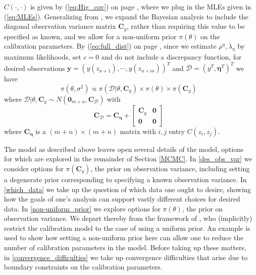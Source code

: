 \documentclass{article}
\begin{document}
$C(\cdot,\cdot)$ is given by (\ref{eq:Hig_cov}) on page \pageref{eq:Hig_cov}, where we plug in the MLEs given in (\ref{eq:MLEs}). Generalizing from \cite{Kennedy2006}, we expand the Bayesian analysis to include the diagonal observation variance matrix $\mathbf C_y$, rather than requiring this value to be specified as known, and we allow for a non-uniform prior $\pi(\theta)$ on the calibration parameters. By (\ref{eq:full_dist}) on page \pageref{eq:full_dist}, 
since we estimate $\rho^\eta,\lambda_\eta$ by maximum likelihoods, set $c=0$ and do not include a discrepancy function, for desired observations $\mathbf y=(y (z_{n+1}),\cdots,y(z_{n+m}))^T$ and $\mathcal D=(y^T, \boldsymbol\eta^T)^T$ we have
\begin{equation}\label{eq:the_model}
\pi(\theta,\sigma^2) \propto \pi (\mathcal D|\theta,\mathbf C_y)\times \pi(\theta)\times \pi(\mathbf C_y)
\end{equation}
where $\mathcal D|\theta,\mathbf C_y \sim N(\boldsymbol 0_{m+n}, \mathbf C_{\mathcal D})$ with 
\begin{equation}\label{eq:the_covariance}
\mathbf C_{\mathcal D} = \mathbf C_{\boldsymbol\eta} + 
\begin{bmatrix}
\mathbf C_y & \boldsymbol 0\\ 
\boldsymbol 0 & \boldsymbol 0
\end{bmatrix}
\end{equation}
where $\mathbf C_{\boldsymbol\eta}$ is a $(m+n)\times(m+n)$ matrix with $i,j$ entry $C(z_i,z_j)$.

The model as described above leaves open several details of the model, options for which are explored in the remainder of Section \ref{MCMC}. In \ref{des_obs_var} we consider options for $\pi(\mathbf C_y)$, the prior on observation variance, including setting a degenerate prior corresponding to specifying a known observation variance. In \ref{which_data} we take up the question of which data one ought to desire, showing how the goals of one's analysis can support vastly different choices for desired data. In \ref{non-uniform_prior} we explore options for $\pi(\theta)$, the prior on observation variance. We depart thereby from the framework of \cite{Kennedy2006}, who (implicitly) restrict the calibration model to the case of using a uniform prior. An example is used to show how setting a non-uniform prior here can allow one to reduce the number of calibration parameters in the model. Before taking up these matters, in \ref{convergence_difficulties} we take up convergence difficulties that arise due to boundary constraints on the calibration parameters.
\end{document}
